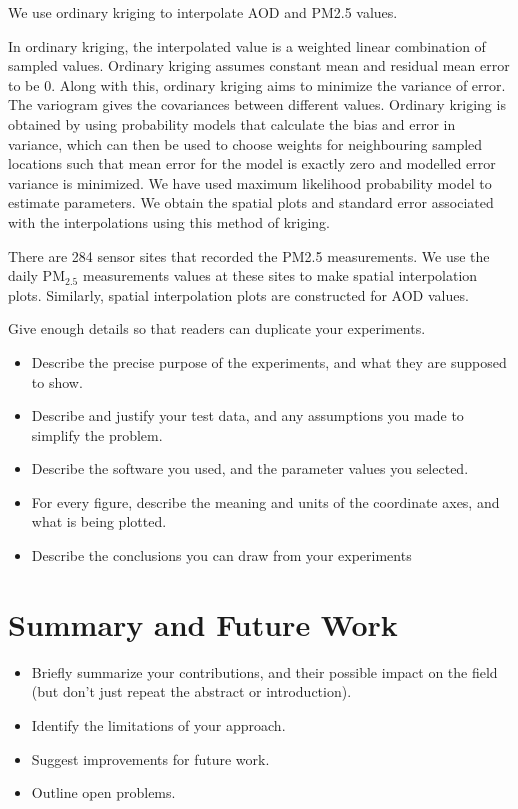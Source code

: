 \documentclass[10pt]{article}
\begin{document}
We use ordinary kriging to interpolate AOD and PM2.5 values.

In ordinary kriging, the interpolated value is a weighted linear combination of sampled values. Ordinary kriging assumes constant mean and  residual mean error to be 0. Along with this, ordinary kriging aims to minimize the variance of error. The variogram gives the covariances between different values. Ordinary kriging is obtained by using probability models that calculate the bias and error in variance, which can then be used to choose weights for neighbouring sampled locations such that mean error for the model is exactly zero and modelled error variance is minimized. We have used maximum likelihood probability model to estimate parameters. We obtain the spatial plots and standard error associated with  the interpolations using this method of kriging. 

There are 284 sensor sites that recorded the PM2.5 measurements. We use the daily  PM$_{2.5}$ measurements values at these sites to make spatial interpolation plots. Similarly, spatial interpolation plots are constructed for AOD values. 


Give enough details so that readers can duplicate your experiments.

\begin{itemize}
\item Describe the precise purpose of the experiments, and what they 
are supposed to show.

\item Describe and justify your test data, and any assumptions you made to 
simplify the problem.

\item Describe the software you used, and the 
parameter values you selected.

\item 
For every figure, describe the meaning and units of the coordinate axes, 
and what is being plotted.

\item Describe the conclusions you can draw from your experiments
\end{itemize}

\section{Summary and Future Work}
\begin{itemize}
\item Briefly summarize your contributions, and their possible
impact on the field (but don't just repeat the abstract or introduction).
\item Identify the limitations of your approach.
\item Suggest improvements for future work.
\item Outline open problems.
\end{itemize}
\end{document}
